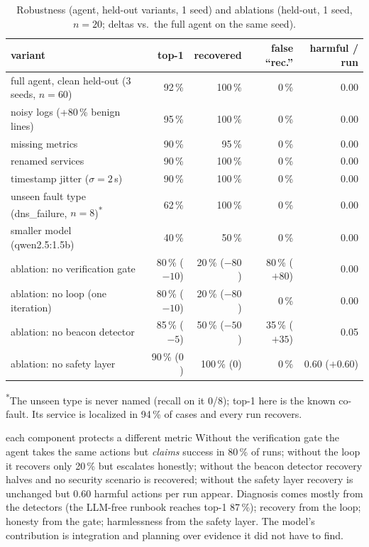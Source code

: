 \documentclass[11pt,a4paper]{article}
\newcommand{\pct}[1]{#1\,\%}
\begin{document}
\begin{table}[H]
\centering\footnotesize
\caption{Robustness (agent, held-out variants, 1 seed) and ablations (held-out, 1 seed, $n=20$; deltas vs.\ the full agent on the same seed).}
\label{tab:robab}
\setlength{\tabcolsep}{4pt}
\begin{tabular}{l r r r r}
\toprule
variant & top-1 & recovered & false ``rec.'' & harmful / run \\
\midrule
\rowcolor{groupfill}full agent, clean held-out (3 seeds, $n=60$) & \pct{92} & \pct{100} & \pct{0} & 0.00 \\
noisy logs (+\pct{80} benign lines) & \pct{95} & \pct{100} & \pct{0} & 0.00 \\
missing metrics & \pct{90} & \pct{95} & \pct{0} & 0.00 \\
renamed services & \pct{90} & \pct{100} & \pct{0} & 0.00 \\
timestamp jitter ($\sigma=2$\,s) & \pct{90} & \pct{100} & \pct{0} & 0.00 \\
unseen fault type (dns\_failure, $n=8$)\textsuperscript{*} & \pct{62} & \pct{100} & \pct{0} & 0.00 \\
smaller model (qwen2.5:1.5b) & \pct{40} & \pct{50} & \pct{0} & 0.00 \\
\midrule
ablation: no verification gate & \pct{80} ($-10$) & \pct{20} ($-80$) & \pct{80} ($+80$) & 0.00 \\
ablation: no loop (one iteration) & \pct{80} ($-10$) & \pct{20} ($-80$) & \pct{0} & 0.00 \\
ablation: no beacon detector & \pct{85} ($-5$) & \pct{50} ($-50$) & \pct{35} ($+35$) & 0.05 \\
ablation: no safety layer & \pct{90} ($0$) & \pct{100} ($0$) & \pct{0} & 0.60 ($+0.60$) \\
\bottomrule
\end{tabular}

\smallskip\raggedright\footnotesize\textsuperscript{*}The unseen type is never named (recall on it 0/8); top-1 here is the known co-fault. Its service is localized in \pct{94} of cases and every run recovers.
\end{table}

\begin{keyfinding}{each component protects a different metric}
Without the verification gate the agent takes the same actions but \emph{claims} success in
\pct{80} of runs; without the loop it recovers only \pct{20} but escalates honestly; without the
beacon detector recovery halves and no security scenario is recovered; without the safety layer
recovery is unchanged but 0.60 harmful actions per run appear. Diagnosis comes mostly from the
detectors (the LLM-free runbook reaches top-1 \pct{87}); recovery from the loop; honesty from the
gate; harmlessness from the safety layer. The model's contribution is integration and planning over
evidence it did not have to find.
\end{keyfinding}
\end{document}
